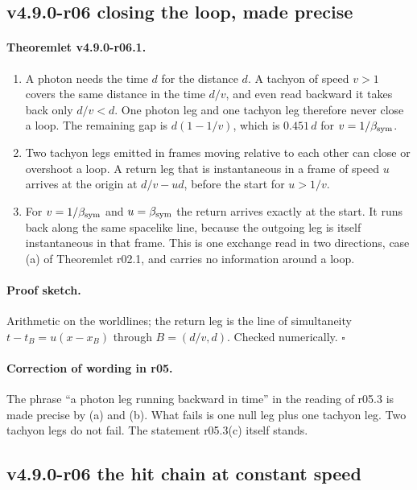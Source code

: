\subsection*{v4.9.0-r06 closing the loop, made precise}
\label{subsec:v490-r06-loop}

\paragraph{Theoremlet v4.9.0-r06.1.}
\begin{enumerate}[leftmargin=2em]
\item[(a)] A photon needs the time \(d\) for the distance \(d\).  A tachyon of speed \(v>1\) covers the same distance in the
time \(d/v\), and even read backward it takes back only \(d/v<d\).  One photon leg and one tachyon leg therefore never close
a loop.  The remaining gap is \(d(1-1/v)\), which is \(0.451\,d\) for \(v=1/\beta_{\mathrm{sym}}\).
\item[(b)] Two tachyon legs emitted in frames moving relative to each other can close or overshoot a loop.  A return leg
that is instantaneous in a frame of speed \(u\) arrives at the origin at \(d/v-ud\), before the start for \(u>1/v\).
\item[(c)] For \(v=1/\beta_{\mathrm{sym}}\) and \(u=\beta_{\mathrm{sym}}\) the return arrives exactly at the start.  It runs back along the same
spacelike line, because the outgoing leg is itself instantaneous in that frame.  This is one exchange read in two
directions, case (a) of Theoremlet r02.1, and carries no information around a loop.
\end{enumerate}

\paragraph{Proof sketch.}
Arithmetic on the worldlines; the return leg is the line of simultaneity \(t-t_B=u(x-x_B)\) through
\(B=(d/v,d)\).  Checked numerically.  \(\square\)

\paragraph{Correction of wording in r05.}
The phrase ``a photon leg running backward in time'' in the reading of r05.3 is made precise by (a) and (b).  What fails
is one null leg plus one tachyon leg.  Two tachyon legs do not fail.  The statement r05.3(c) itself stands.

\subsection*{v4.9.0-r06 the hit chain at constant speed}
\label{subsec:v490-r06-chain}


